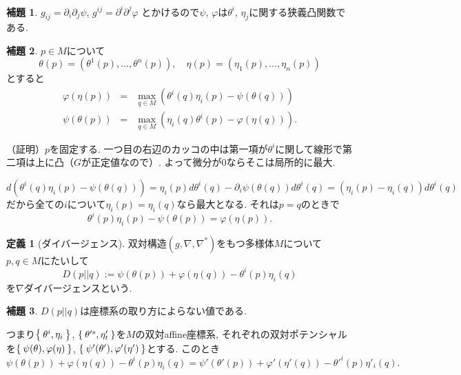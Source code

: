 \documentclass{jsarticle}
\newcommand{\con}{\nabla}
\newcommand{\dcon}{\con^{*}}
\theoremstyle{definition}
\newtheorem{lemma}{補題}
\newtheorem{definition}[theorem]{定義}
\numberwithin{theorem}{section}
\begin{document}
\begin{lemma}
$g_{ij}=\partial_i \partial_j \psi$, $g^{ij}=\partial^i \partial^j \varphi$
とかけるので$\psi$, $\varphi$は$\theta^i$, $\eta_j$に関する狭義凸関数である.
\end{lemma}

\begin{lemma}
\label{legendre}
$p \in M$について
\[
\theta(p)=(\theta^1(p), \dots, \theta^n(p)), \quad \eta(p)=(\eta_1(p), \dots, \eta_n(p))
\]
とすると
\begin{eqnarray*}
\varphi(\eta(p))&=&\max_{q\in M}(\theta^i(q) \eta_i(p)-\psi(\theta(q)))\\
\psi(\theta(p))&=&\max_{q\in M}(\eta_i(q)\theta^i(p)-\varphi(\eta(q))).
\end{eqnarray*}
\end{lemma}

（証明）$p$を固定する. 一つ目の右辺のカッコの中は第一項が$\theta^i$に関して線形で第二項は上に凸（$G$が正定値なので）.
よって微分が0ならそこは局所的に最大.

\[
d(\theta^i(q) \eta_i(p)-\psi(\theta(q)))=\eta_i(p) d \theta^i(q) - \partial_i \psi(\theta(q))d\theta^i(q)=(\eta_i(p)-\eta_i(q))d\theta^i(q)
\]
だから全ての$i$について$\eta_i(p)=\eta_i(q)$なら最大となる. それは$p=q$のときで
\[
\theta^i(p) \eta_i(p)-\psi(\theta(p))=\varphi(\eta(p)).
\]

\begin{definition}[ダイバージェンス]
双対構造$(g,\con,\dcon)$をもつ多様体$M$について$p, q \in M$にたいして
\[
D(p||q):=\psi(\theta(p))+\varphi(\eta(q))-\theta^i(p)\eta_i(q)
\]
を$\con$ダイバージェンスという.
\end{definition}

\begin{lemma}
$D(p||q)$は座標系の取り方によらない値である.

つまり$\Set{\theta^i,\eta_i}$, $\Set{\theta'^s, \eta'_t}$を$M$の双対affine座標系,
それぞれの双対ポテンシャルを$\Set{\psi(\theta),\varphi(\eta)}$, $\Set{\psi'(\theta'),\varphi'(\eta')}$とする.
このとき
\[
\psi(\theta(p))+\varphi(\eta(q))-\theta^i(p)\eta_i(q)=\psi'(\theta'(p))+\varphi'(\eta'(q))-\theta'^i(p)\eta'_i(q).
\]
\end{lemma}
\end{document}
